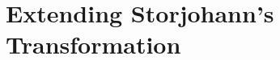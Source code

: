 
\section{Extending Storjohann's Transformation}

\label{sec:transform}

\begin{comment}
notations: 
\begin{itemize}
\item Matrices

\begin{itemize}
\item Polynomial matrices: bold capital $\mathbf{A,B,F,G,P,R}$

\begin{itemize}
\item $\mathbf{F}$: input matrix,

\begin{itemize}
\item $\bar{\mathbf{F}}$: Storjohann transformed matrix, 
\item $\check{\mathbf{F}}$: the transformation that extends $\bar{\mathbf{F}}$. 
\end{itemize}
\item $\mathbf{G}$: input matrix for the second subproblem. 
\end{itemize}
\item scalar matrices: non-bold Capital, used to distinguish coefficient
matrix 
\item Identity matrix: $\mathbf{I}$ this is to be consistent with polynomial
matrices, as identity is considered as an important element of polynomial
matrices. 
\end{itemize}
\item order

\begin{itemize}
\item $\sigma,\omega$ 
\end{itemize}
\item vectors

\begin{itemize}
\item polynomial vectors: $\mathbf{p,q,r,s,t}$ 
\item $\mathbf{p}$: element in basis $\mathbf{P}$ 
\item $\mathbf{q}:$ some test element in $\left\langle \left(\mathbf{F},\sigma\right)\right\rangle $ 
\item $\bar{\mathbf{t}}$: test element in $\left\langle \left(\check{\mathbf{F}},\vec{\omega}\right)\right\rangle $ 
\end{itemize}
\item shifts:


\end{comment}
